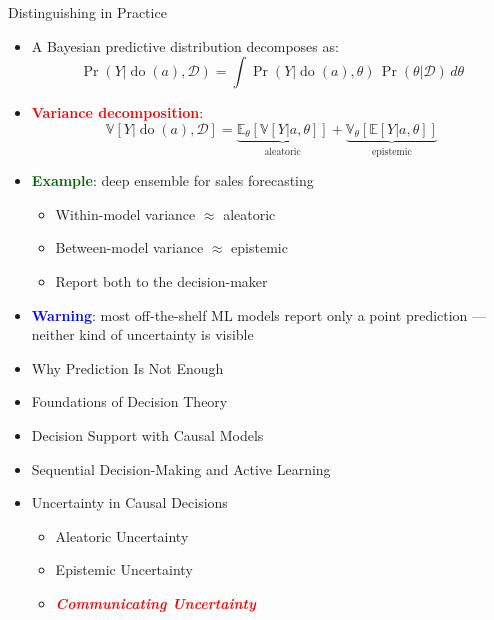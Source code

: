 \documentclass[
  10pt,
  ignorenonframetext,
]{beamer}
\providecommand{\tightlist}{%
  \setlength{\itemsep}{0pt}\setlength{\parskip}{0pt}}
\newcommand{\EE}{\mathbb{E}}
\newcommand{\VV}{\mathbb{V}}
\begin{document}
\begin{frame}{Distinguishing in Practice}
\label{distinguishing-in-practice}
\begin{itemize}
\item
  A Bayesian predictive distribution decomposes as: \[
  \Pr(Y | \operatorname{do}(a), \mathcal{D}) =
  \int \Pr(Y | \operatorname{do}(a), \theta) \, \Pr(\theta | \mathcal{D}) \, d\theta
  \]
\item
  \textbf{\textcolor{red}{Variance decomposition}}: \[
  \VV[Y | \operatorname{do}(a), \mathcal{D}] =
  \underbrace{\EE_\theta[\VV[Y | a, \theta]]}_{\text{aleatoric}} +
  \underbrace{\VV_\theta[\EE[Y | a, \theta]]}_{\text{epistemic}}
  \]
\item
  \textbf{\textcolor{darkgreen}{Example}}: deep ensemble for sales
  forecasting

  \begin{itemize}
  \tightlist
  \item
    Within-model variance \(\approx\) aleatoric
  \item
    Between-model variance \(\approx\) epistemic
  \item
    Report both to the decision-maker
  \end{itemize}
\item
  \textbf{\textcolor{blue}{Warning}}: most off-the-shelf ML models
  report only a point prediction --- neither kind of uncertainty is
  visible
\end{itemize}
\end{frame}

\begin{frame}{}
\label{section-19}
\begin{itemize}
\tightlist
\item
  Why Prediction Is Not Enough
\item
  Foundations of Decision Theory
\item
  Decision Support with Causal Models
\item
  Sequential Decision-Making and Active Learning
\item
  Uncertainty in Causal Decisions

  \begin{itemize}
  \tightlist
  \item
    Aleatoric Uncertainty
  \item
    Epistemic Uncertainty
  \item
    \emph{\textbf{\textcolor{red}{Communicating Uncertainty}}}
  \end{itemize}
\end{itemize}
\end{frame}
\end{document}
